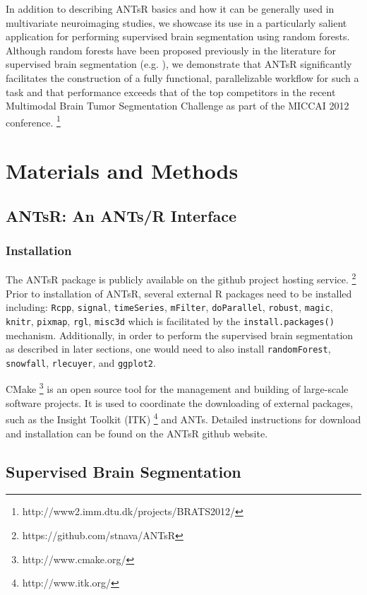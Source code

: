 \documentclass[final,5p,times,twocolumn]{elsarticle}
\begin{document}
In addition to describing ANTsR basics and how it can be generally
used in multivariate neuroimaging studies, we showcase its use in
a particularly salient application for performing supervised brain
segmentation using random forests.  Although random forests have
been proposed previously in the literature for supervised brain 
segmentation (e.g. \cite{geremia2011,zikic2012}), we demonstrate that ANTsR
significantly facilitates the construction of a fully functional, 
parallelizable workflow for such a task and that performance 
exceeds that of the top competitors in the recent Multimodal Brain
Tumor Segmentation Challenge as part of the MICCAI 2012 conference.%
\footnote{
http://www2.imm.dtu.dk/projects/BRATS2012/  
}

\section{Materials and Methods}

\subsection{ANTsR:  An ANTs/R Interface}

\subsubsection{Installation}

The ANTsR package is publicly available on the github project hosting service.%
\footnote{
https://github.com/stnava/ANTsR
}
Prior to installation of ANTsR, several external R packages
need to be installed including: \verb#Rcpp#, \verb#signal#, \verb#timeSeries#, 
\verb#mFilter#, \verb#doParallel#, \verb#robust#, \verb#magic#, \verb#knitr#, \verb#pixmap#, 
\verb#rgl#, \verb#misc3d# which is facilitated by the 
\verb#install.packages()# mechanism.  Additionally, in order
to perform the supervised brain segmentation as described 
in later sections, one would need to also install 
\verb#randomForest#, \verb#snowfall#, \verb#rlecuyer#,
and \verb#ggplot2#. 

CMake%
\footnote{
http://www.cmake.org/
}
is an open source tool for the management and building of 
large-scale software projects.  It is used
to coordinate the downloading of external packages,
such as the Insight Toolkit (ITK)%
\footnote{
http://www.itk.org/
}
and ANTs.  Detailed instructions for download and
installation can be found on the ANTsR github website.

\subsection{Supervised Brain Segmentation}
\end{document}
